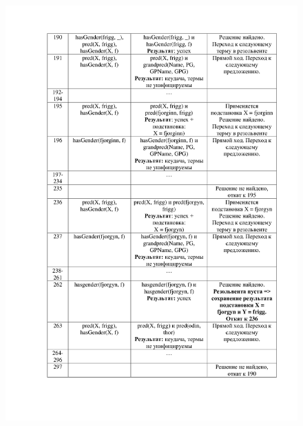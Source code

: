 \documentclass[12pt]{report}
\begin{document}
\begin{figure}[H]
	\centering
	\includegraphics[scale=0.32]{2.png}
	\label{fig:2}
\end{figure}
\end{document}
